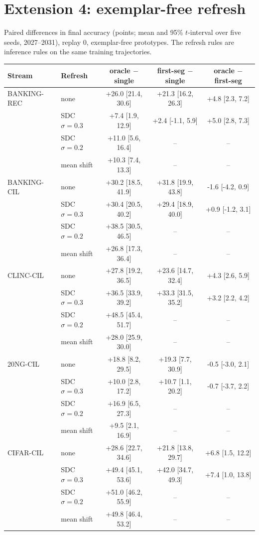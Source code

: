 \section{Extension 4: exemplar-free refresh}
\label{app:ext4}
Paired differences in final accuracy (points; mean and 95\% $t$-interval over five seeds, 2027--2031), replay 0, exemplar-free prototypes. The refresh rules are inference rules on the same training trajectories.
\begin{table}[h]\centering\small
\begin{tabular}{llccc}
\toprule
Stream & Refresh & oracle $-$ single & first-seg $-$ single & oracle $-$ first-seg\\
\midrule
BANKING-REC & none & +26.0 [21.4, 30.6] & +21.3 [16.2, 26.3] & +4.8 [2.3, 7.2]\\
 & SDC $\sigma{=}0.3$ & +7.4 [1.9, 12.9] & +2.4 [-1.1, 5.9] & +5.0 [2.8, 7.3]\\
 & SDC $\sigma{=}0.2$ & +11.0 [5.6, 16.4] & -- & --\\
 & mean shift & +10.3 [7.4, 13.3] & -- & --\\
\midrule
BANKING-CIL & none & +30.2 [18.5, 41.9] & +31.8 [19.9, 43.8] & -1.6 [-4.2, 0.9]\\
 & SDC $\sigma{=}0.3$ & +30.4 [20.5, 40.2] & +29.4 [18.9, 40.0] & +0.9 [-1.2, 3.1]\\
 & SDC $\sigma{=}0.2$ & +38.5 [30.5, 46.5] & -- & --\\
 & mean shift & +26.8 [17.3, 36.4] & -- & --\\
\midrule
CLINC-CIL & none & +27.8 [19.2, 36.5] & +23.6 [14.7, 32.4] & +4.3 [2.6, 5.9]\\
 & SDC $\sigma{=}0.3$ & +36.5 [33.9, 39.2] & +33.3 [31.5, 35.2] & +3.2 [2.2, 4.2]\\
 & SDC $\sigma{=}0.2$ & +48.5 [45.4, 51.7] & -- & --\\
 & mean shift & +28.0 [25.9, 30.0] & -- & --\\
\midrule
20NG-CIL & none & +18.8 [8.2, 29.5] & +19.3 [7.7, 30.9] & -0.5 [-3.0, 2.1]\\
 & SDC $\sigma{=}0.3$ & +10.0 [2.8, 17.2] & +10.7 [1.1, 20.2] & -0.7 [-3.7, 2.2]\\
 & SDC $\sigma{=}0.2$ & +16.9 [6.5, 27.3] & -- & --\\
 & mean shift & +9.5 [2.1, 16.9] & -- & --\\
\midrule
CIFAR-CIL & none & +28.6 [22.7, 34.6] & +21.8 [13.8, 29.7] & +6.8 [1.5, 12.2]\\
 & SDC $\sigma{=}0.3$ & +49.4 [45.1, 53.6] & +42.0 [34.7, 49.3] & +7.4 [1.0, 13.8]\\
 & SDC $\sigma{=}0.2$ & +51.0 [46.2, 55.9] & -- & --\\
 & mean shift & +49.8 [46.4, 53.2] & -- & --\\
\bottomrule
\end{tabular}
\end{table}
